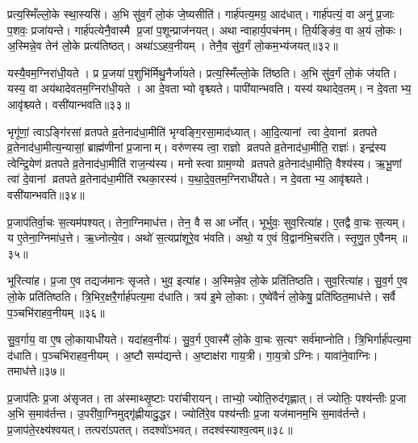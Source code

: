 प्रत्य॒स्मिँल्लो॒के स्था॒स्यसि॑।
अ॒भि सु॑व॒र्गं लो॒कं जे॒ष्यसीति॑।
गार्\mbox{}ह॑पत्य॒मग्र॒ आद॑धात्।
गार्\mbox{}ह॑पत्यं॒ वा अनु॑ प्र॒जाः प॒शवः॒ प्रजा॑यन्ते।
गार्\mbox{}ह॑पत्येनै॒वास्मै प्र॒जां प॒शून्प्राज॑नयत्।
अथान्वाहार्य॒पच॑नम्।
ति॒र्यङ्ङि॑व॒ वा अ॒यं लो॒कः।
अ॒स्मिन्ने॒व तेन॑ लो॒के प्रत्य॑तिष्ठत्।
अथा॑ऽऽहव॒नीयम्।
तेनै॒व सु॑व॒र्गं लो॒कम॒भ्य॑जयत्॥३२॥

यस्यै॒वम॒ग्निरा॑धी॒यते।
प्र प्र॒जया॑ प॒शुभि॑र्मिथु॒नैर्जा॑यते।
प्रत्य॒स्मिँल्लो॒के ति॑ष्ठति।
अ॒भि सु॑व॒र्गं लो॒कं ज॑यति।
यस्य॒ वा अय॑थादेवतम॒ग्निरा॑धी॒यते।
आ दे॒वताभ्यो वृश्च्यते।
पापी॑यान्भवति।
यस्य॑ यथादेव॒तम्।
न दे॒वताभ्य॒ आवृ॑श्च्यते।
वसी॑यान्भवति॥३३॥

भृगू॑णां॒ त्वा\-ऽङ्गि॑रसां व्रतपते व्र॒तेनाद॑धा॒मीति॑ भृग्वङ्गि॒रसा॒\-माद॑ध्यात्।
आ॒दि॒त्यानां त्वा दे॒वानां व्रतपते व्र॒तेनाद॑धा॒मी\-त्य॒न्यासां॒ ब्राह्म॑णीनां प्र॒जानाम्।
वरु॑णस्य त्वा॒ राज्ञो व्रतपते व्र॒तेनाद॑धा॒मीति॒ राज्ञः॑।
इन्द्र॑स्य त्वेन्द्रि॒येण॑ व्रतपते व्र॒तेनाद॑धा॒मीति॑ राज॒न्य॑स्य।
मनोस्त्वा ग्राम॒ण्यो व्रतपते व्र॒तेनाद॑धा॒मीति॒ वैश्य॑स्य।
ऋ॒भू॒णां त्वा॑ दे॒वानां व्रतपते व्र॒तेनाद॑धा॒मीति॑ रथका॒रस्य॑।
य॒था॒दे॒व॒तम॒ग्निराधी॑यते।
न दे॒वताभ्य॒ आवृ॑श्च्यते।
वसी॑यान्भवति॥३४॥

प्र॒जाप॑तिर्वा॒चः स॒त्यम॑पश्यत्।
तेना॒ग्निमाध॑त्त।
तेन॒ वै स आर्ध्नोत्।
भूर्भुवः॒ सुव॒रित्या॑ह।
ए॒तद्वै वा॒चः स॒त्यम्।
य ए॒तेना॒ग्निमा॑ध॒त्ते।
ऋ॒ध्नोत्ये॒व।
अथो॑ स॒त्यप्रा॑शूरे॒व भ॑वति।
अथो॒ य ए॒वं वि॒द्वान॑भि॒चर॑ति।
स्तृ॒णु॒त ए॒वैनम्॥३५॥

भूरित्या॑ह।
प्र॒जा ए॒व तद्यज॑मानः सृजते।
भुव॒ इत्या॑ह।
अ॒स्मिन्ने॒व लो॒के प्रति॑तिष्ठति।
सुव॒रित्या॑ह।
सु॒व॒र्ग ए॒व लो॒के प्रति॑तिष्ठति।
त्रि॒भिर॒क्षरै॒र्गार्\mbox{}ह॑पत्य॒मा द॑धाति।
त्रय॑ इ॒मे लो॒काः।
ए॒ष्वे॑वैनं॑ लो॒केषु॒ प्रति॑ष्ठित॒माध॑त्ते।
सर्वै प॒ञ्चभि॑राहव॒नीयम्॥३६॥

सु॒व॒र्गाय॒ वा ए॒ष लो॒कायाधी॑यते।
यदा॑हव॒नीयः॑।
सु॒व॒र्ग ए॒वास्मै॑ लो॒के वा॒चः स॒त्यꣳ सर्व॑माप्नोति।
त्रि॒भिर्गार्\mbox{}ह॑पत्य॒मा द॑धाति।
प॒ञ्चभि॑राहव॒नीयम्।
अ॒ष्टौ सम्प॑द्यन्ते।
अ॒ष्टाक्ष॑रा गाय॒त्री।
गा॒य॒त्रो\-ऽग्निः।
यावा॑ने॒वाग्निः।
तमाध॑त्ते॥३७॥

प्र॒जाप॑तिः प्र॒जा अ॑सृजत।
ता अ॑स्माथ्सृ॒ष्टाः परा॑चीरायन्।
ताभ्यो॒ ज्योति॒रुद॑गृह्णात्।
तं ज्योतिः॒ पश्य॑न्तीः प्र॒जा अ॒भि स॒माव॑र्तन्त।
उ॒परी॑वा॒ग्निमुद्गृ॑ह्णीयादु॒द्धर\sn{}।
ज्योति॑रे॒व पश्य॑न्तीः प्र॒जा यज॑मानम॒भि स॒माव॑र्तन्ते।
प्र॒जाप॑ते॒रक्ष्य॑श्वयत्।
तत्परा॑\-ऽपतत्।
तदश्वो॑\-ऽभवत्।
तदश्व॑स्याश्व॒त्वम्॥३८॥

